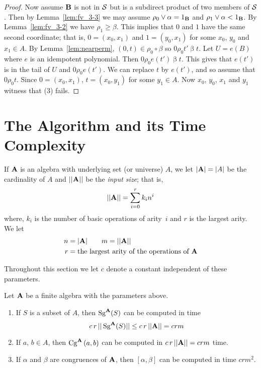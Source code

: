 \begin{proof}
Now assume $\alg B$ is not in $\sS$ but is a subdirect 
product of two members of $\sS$.
Then
by Lemma~\ref{lem:fv_3-3} we may 
assume $\rho_0 \join \alpha = 1_{\alg B}$ and
$\rho_1 \join \alpha < 1_{\alg B}$. By Lemma~\ref{lem:fv_3-2}
we have $\rho_1 \ge \beta$.
This implies that $0$ and $1$ have the same second coordinate; that is,
$0 = (x_0,x_1)$ and $1 = (y_0,x_1)$ for some $x_0$, $y_0$ and $x_1\in A$.
By Lemma~\ref{lem:nearperm}, $(0,t) \in \rho_0 \circ \beta$
so $0 \mathrel {\rho_0} t' \mathrel{\beta} t$. Let $U = e(B)$
where $e$ is an idempotent polynomial. Then
$0 \mathrel {\rho_0} e(t') \mathrel{\beta} t$. This gives
that $e(t')$ is in the tail of $U$ and 
$0 \mathrel{\rho_0} e(t')$. We can
replace $t$ by $e(t')$, and so assume that 
$0 \mathrel{\rho_0} t$.
Since $0 = (x_0,x_1)$, $t = (x_0,y_1)$ for some $y_1\in A$. 
Now
$x_0$, $y_0$, $x_1$ and $y_1$ witness that (3) fails.
\end{proof}



\section{The Algorithm and its Time Complexity}

If $\alg A$ is an algebra with underlying set (or universe) $A$,
we let $|\alg A| = |A|$ be the cardinality of
$A$ and $||\alg A||$ be the \emph{input size}; that is,
\[
||\alg A|| = \sum_{i=0}^r k_i n^i
\]
where, $k_i$ is the number of basic operations of arity~$i$ and $r$
is the largest arity. We let
\begin{align*}
n &= |\alg A|  \qquad m = ||\alg A|| \\
r &= \text{the largest arity of the operations of $\alg A$}
\end{align*}

Throughout this section we let $c$ denote a constant independent of
these parameters.

\begin{prop}\label{speedprop}
Let $\alg A$ be a finite algebra with the parameters above.
\begin{enumerate}
\item If $S$ is a subset of $A$, then $\Sg^{\alg A}(S)$ can be computed
in time
\[
c\, r\,||\Sg^{\alg A}(S)|| \le c\, r\,||\alg A|| = crm
\]
\item If $a$, $b \in A$, then $\Cga a b A$ can be computed in
$c\, r\, ||\alg A|| = crm$ time.
\item
If $\alpha$ and $\beta$ are congruences of $\alg A$,
then $[\alpha,\beta]$ can be computed in time $crm^2$.
\end{enumerate}
\end{prop}

